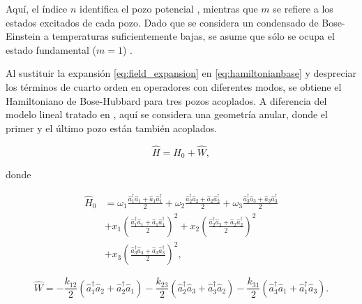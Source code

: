 \noindent Aquí, el índice $ n $ identifica el pozo potencial , mientras que $ m $
se refiere a los estados excitados de cada pozo. Dado que se considera un condensado
de Bose-Einstein a temperaturas suficientemente bajas, se asume que sólo se ocupa el
estado fundamental ($ m = 1 $) \cite{mossmann2006semiclassical}.

Al sustituir la expansión \eqref{eq:field_expansion} en \eqref{eq:hamiltonianbase} y
despreciar los términos de cuarto orden en operadores con diferentes modos, se obtiene
el Hamiltoniano de Bose-Hubbard para tres pozos acoplados. A diferencia del modelo lineal
tratado en \cite{mossmann2006semiclassical}, aquí se considera una geometría anular,
donde el primer y el último pozo están también acoplados.

\begin{equation}
    \hat{H} = \hat{H}_{0} + \hat{W},
    \label{eq:hamiltonian_total}
\end{equation}

\noindent donde

\begin{equation}
    \begin{split}
        \hat{H}_0 & = \omega_1 \frac{\hat{a}^{\dagger}_{1}\hat{a}_{1} + \hat{a}_{1}\hat{a}^{\dagger}_{1}}{2}
        + \omega_2 \frac{\hat{a}^{\dagger}_{2}\hat{a}_{2} + \hat{a}_{2}\hat{a}^{\dagger}_{2}}{2}
        + \omega_3 \frac{\hat{a}^{\dagger}_{3}\hat{a}_{3} + \hat{a}_{3}\hat{a}^{\dagger}_{3}}{2}               \\
                  & + x_1 \left( \frac{\hat{a}^{\dagger}_{1}\hat{a}_{1} + \hat{a}_{1}\hat{a}^{\dagger}_{1}}{2}
        \right)^2 + x_2 \left( \frac{\hat{a}^{\dagger}_{2}\hat{a}_{2} + \hat{a}_{2}\hat{a}^{\dagger}_{2}}{2}
        \right)^2                                                                                              \\
                  & + x_3 \left( \frac{\hat{a}^{\dagger}_{3}\hat{a}_{3} + \hat{a}_{3}\hat{a}^{\dagger}_{3}}{2}
        \right)^2,
    \end{split}
    \label{eq:H0_local}
\end{equation}

\begin{equation}
    \hat{W} = -\frac{k_{12}}{2} (\hat{a}^{\dagger}_{1}\hat{a}_{2} + \hat{a}^{\dagger}_{2}\hat{a}_{1})
    - \frac{k_{23}}{2} (\hat{a}^{\dagger}_{2}\hat{a}_{3} + \hat{a}^{\dagger}_{3}\hat{a}_{2}) -
    \frac{k_{31}}{2} (\hat{a}^{\dagger}_{3}\hat{a}_{1} + \hat{a}^{\dagger}_{1}\hat{a}_{3}).
    \label{eq:W_interaction}
\end{equation}

